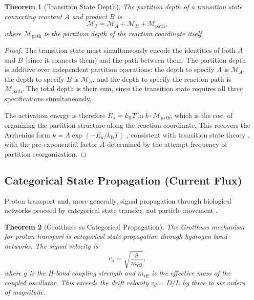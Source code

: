 \documentclass[twocolumn,10pt,a4paper]{article}
\newtheorem{theorem}{Theorem}[section]
\theoremstyle{definition}
\theoremstyle{remark}
\newcommand{\kB}{k_{\mathrm{B}}}
\newcommand{\Depth}{\mathcal{M}}
\begin{document}
\begin{theorem}[Transition State Depth]
\label{thm:transition}
The partition depth of a transition state connecting reactant $A$ and product $B$ is
\begin{equation}
    \Depth_T = \Depth_A + \Depth_B + \Depth_{\mathrm{path}},
    \label{eq:transition_depth}
\end{equation}
where $\Depth_{\mathrm{path}}$ is the partition depth of the reaction coordinate itself.
\end{theorem}

\begin{proof}
The transition state must simultaneously encode the identities of both $A$ and $B$ (since it connects them) and the path between them. The partition depth is additive over independent partition operations: the depth to specify $A$ is $\Depth_A$, the depth to specify $B$ is $\Depth_B$, and the depth to specify the reaction path is $\Depth_{\mathrm{path}}$. The total depth is their sum, since the transition state requires all three specifications simultaneously.

The activation energy is therefore $E_a = \kB T \ln b \cdot \Depth_{\mathrm{path}}$, which is the cost of organizing the partition structure along the reaction coordinate. This recovers the Arrhenius form $k = A \exp(-E_a / \kB T)$ \citep{Arrhenius1889}, consistent with transition state theory \citep{Eyring1935}, with the pre-exponential factor $A$ determined by the attempt frequency of partition reorganization.
\end{proof}

\subsection{Categorical State Propagation (Current Flux)}
\label{sec:current_flux}

Proton transport and, more generally, signal propagation through biological networks proceed by categorical state transfer, not particle movement \citep{Sachikonye2024b}.

\begin{theorem}[Grotthuss as Categorical Propagation]
\label{thm:grotthuss}
The Grotthuss mechanism for proton transport \citep{Grotthuss1806} is categorical state propagation through hydrogen bond networks. The signal velocity is
\begin{equation}
    v_s = \sqrt{\frac{g}{m_{\mathrm{eff}}}},
    \label{eq:signal_velocity}
\end{equation}
where $g$ is the H-bond coupling strength and $m_{\mathrm{eff}}$ is the effective mass of the coupled oscillator. This exceeds the drift velocity $v_d = D/L$ by three to six orders of magnitude.
\end{theorem}
\end{document}
